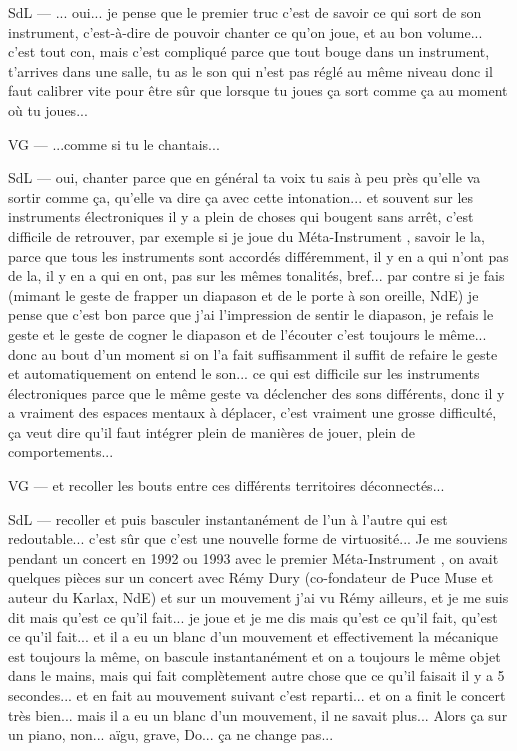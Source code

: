 SdL — ... oui... je pense que le premier truc c'est de savoir ce qui sort de son instrument, c'est-à-dire de pouvoir chanter ce qu'on joue, et au bon volume... c'est tout con, mais c'est compliqué parce que tout bouge dans un instrument, t'arrives dans une salle, tu as le son qui n'est pas réglé au même niveau donc il faut calibrer vite pour être sûr que lorsque tu joues ça sort comme ça au moment où tu joues... 

VG — ...comme si tu le chantais... 

SdL — oui, chanter parce que en général ta voix tu sais à peu près qu'elle va sortir comme ça, qu'elle va dire ça avec cette intonation... et souvent sur les instruments électroniques il y a plein de choses qui bougent sans arrêt, c'est difficile de retrouver, par exemple si je joue du Méta-Instrument , savoir le la, parce que tous les instruments sont accordés différemment, il y en a qui n'ont pas de la, il y en a qui en ont, pas sur les mêmes tonalités, bref... par contre si je fais (mimant le geste de frapper un diapason et de le porte à son oreille, NdE) je pense que c'est bon parce que j'ai l'impression de sentir le diapason, je refais le geste et le geste de cogner le diapason et de l'écouter c'est toujours le même... donc au bout d'un moment si on l'a fait suffisamment il suffit de refaire le geste et automatiquement on entend le son... ce qui est difficile sur les instruments électroniques parce que le même geste va déclencher des sons différents, donc il y a vraiment des espaces mentaux à déplacer, c'est vraiment une grosse difficulté, ça veut dire qu'il faut intégrer plein de manières de jouer, plein de comportements... 

VG — et recoller les bouts entre ces différents territoires déconnectés... 

SdL — recoller et puis basculer instantanément de l'un à l'autre qui est redoutable... c'est sûr que c'est une nouvelle forme de virtuosité... Je me souviens pendant un concert en 1992 ou 1993 avec le premier Méta-Instrument , on avait quelques pièces sur un concert avec Rémy Dury (co-fondateur de Puce Muse et auteur du Karlax, NdE) et sur un mouvement j'ai vu Rémy ailleurs, et je me suis dit mais qu'est ce qu'il fait... je joue et je me dis mais qu'est ce qu'il fait, qu'est ce qu'il fait... et il a eu un blanc d'un mouvement et effectivement la mécanique est toujours la même, on bascule instantanément et on a toujours le même objet dans le mains, mais qui fait complètement autre chose que ce qu'il faisait il y a 5 secondes... et en fait au mouvement suivant c'est reparti... et on a finit le concert très bien... mais il a eu un blanc d'un mouvement, il ne savait plus... Alors ça sur un piano, non... aïgu, grave, Do... ça ne change pas... 

